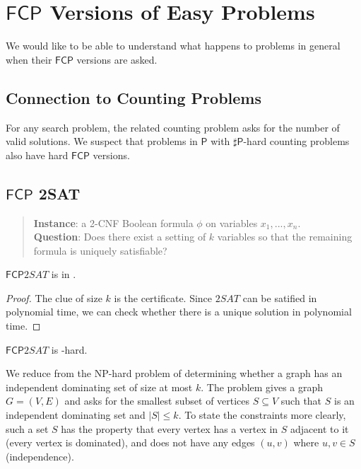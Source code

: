 \documentclass[runningheads,a4paper]{llncs}
\begin{document}
\section{$\mathsf{FCP}$ Versions of Easy Problems}
\label{sec:easyproblems}

We would like to be able to understand what happens to problems in general when their $\mathsf{FCP}$ versions are asked.

\subsection{Connection to Counting Problems}

For any search problem, the related counting problem asks for the number of valid solutions. We suspect that problems in $\mathsf{P}$ with $\sharp \mathsf{P}$-hard counting problems also have hard $\mathsf{FCP}$ versions.

\subsection{$\mathsf{FCP}$ 2SAT} 

\begin{quote}
\textbf{Instance}: a 2-CNF Boolean formula $\phi$ on variables $x_1, ..., x_n$. \\
\textbf{Question}: Does there exist a setting of $k$ variables so that the remaining formula is uniquely satisfiable?
\end{quote}

\begin{proposition}
$\mathsf{FCP} 2SAT$ is in \NP.
\end{proposition}

\begin{proof}
The clue of size $k$ is the certificate. Since $2SAT$ can be satified in polynomial time, we can check whether there is a unique solution in polynomial time.
\end{proof}

\begin{theorem} 
$\mathsf{FCP} 2SAT$ is \NP-hard.
\end{theorem}

We reduce from the NP-hard problem of determining whether a graph has an independent dominating set of size at most $k$. The problem gives a graph $G = (V,E)$ and asks for the smallest subset of vertices $S \subseteq V$ such that $S$ is an independent dominating set and $|S| \leq k$. To state the constraints more clearly, such a set $S$ has the property that every vertex has a vertex in $S$ adjacent to it (every vertex is dominated), and does not have any edges $(u,v)$ where $u,v \in S$ (independence). \\
\end{document}
